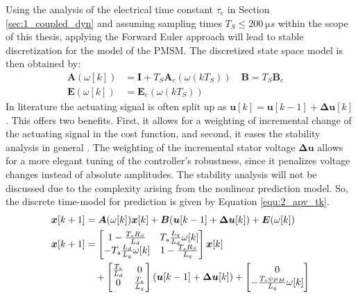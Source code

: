 Using the analysis of the electrical time constant $\tau_e$ in Section \ref{sec:1_coupled_dyn} and assuming sampling times $T_S \le \qty{200}{\micro s}$ within the scope of this thesis, applying the Forward Euler approach will lead to stable discretization for the model of the PMSM. The discretized state space model is then obtained by:
\begin{align*}
	\boldsymbol{A}(\omega[k]) &= \boldsymbol{I} + T_S\boldsymbol{A}_c(\omega(kT_S)) \quad \boldsymbol{B} = T_S \boldsymbol{B}_c \quad \\  
	\boldsymbol{E}(\omega[k]) &= \boldsymbol{E}_c (\omega(kT_S)) 
\end{align*}
In literature the actuating signal is often split up as $ \bm{u}[k]=\bm{u}[k-1] + \bm{\Delta u}[k]$. This offers two benefits. First, it allows for a weighting of incremental change of the actuating signal in the cost function, and second, it eases the stability analysis in general  \cite{mpcCamacho} \cite{mpcRawlings}. The weighting of the incremental stator voltage $\bm{\Delta u}$ allows for a more elegant tuning of the controller's robustness, since it penalizes voltage changes instead of absolute amplitudes.  The stability analysis  will not be discussed due to the complexity arising from the nonlinear prediction model. So, the discrete time-model for prediction is given by Equation \eqref{equ:2_apv_tk}.
\begin{equation}
	\begin{split}
		{\bm{x}} [k+1] &= \bm{A}(\omega[k]) {\bm{x}}[k] + \bm{B} (\bm{u}[k-1] + \bm{\Delta u}[k] ) + \bm{E}(\omega[k]) \\
		{\bm{x}}[k+1] &= \begin{bmatrix} 
			1-\frac{T_s R_S}{L_d} & T_s\frac{L_q}{L_d}\omega[k] \\
			 -T_s\frac{L_d}{L_q}\omega[k] & 1-\frac{T_s R_S}{L_q} 
		\end{bmatrix} {\bm{x}}[k] \\
		 &\quad+ 
		 \begin{bmatrix}
		 	 \frac{T_s}{L_d} & 0 \\
		 	  0 & \frac{T_s}{L_q} 
		 \end{bmatrix} \left( \bm{u}[k-1]+\bm{\Delta u}[k] \right) + 
		 \begin{bmatrix} 0 \\
		 	 -\frac{T_s\psi_{PM}}{L_q}\omega[k] 
 		 \end{bmatrix}
	\end{split}
	\label{equ:2_apv_tk}
\end{equation}

